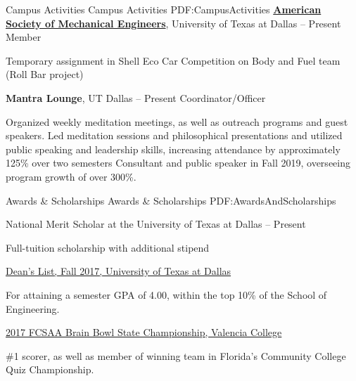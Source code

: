 \documentclass[letterpaper,MMMyyyy,nonstopmode]{simpleresumecv}
\begin{document}
\begin{Body}
\Section
{Campus Activities}
{Campus Activities}
{PDF:CampusActivities}
\Entry
\href{https://www.facebook.com/groups/UTDASME/}
{\textbf{American Society of Mechanical Engineers}},
University of Texas at Dallas
\hfill
{} --
Present
\SmallGap
\BulletItem
Member 
\begin{Detail}
\SubBulletItem
Temporary assignment in Shell Eco Car Competition on Body and Fuel team (Roll Bar project)
\end{Detail}
\Entry
\textbf{Mantra Lounge},
UT Dallas
\hfill
{} --
Present%
\SmallGap
\BulletItem
Coordinator/Officer
\begin{Detail}
\SubBulletItem
Organized weekly meditation meetings, as well as outreach programs and guest speakers.
\SubBulletItem
Led meditation sessions and philosophical presentations and utilized public speaking and leadership skills, increasing attendance by approximately 125\% over two semesters
\SubBulletItem
Consultant and public speaker in Fall 2019, overseeing program growth of over 300\%.
\end{Detail}


\Section
{Awards \&\newline
Scholarships}
{Awards \& Scholarships}
{PDF:AwardsAndScholarships}

\BulletItem
National Merit Scholar at the University of Texas at Dallas
\hfill
{} -- Present
\begin{Detail}
\Item
Full-tuition scholarship with additional stipend %
\end{Detail}

\BulletItem
\href{https://www.utdallas.edu/news/2018/2/8-32826_More-than-1500-Students-Earn-Spots-on-Fall-Deans-L_story-wide.html}
{Dean's List,
Fall 2017,
University of Texas at Dallas}
\hfill
\begin{Detail}
\Item
For attaining a semester GPA of 4.00, within the top 10\% of the School of Engineering.
\end{Detail}

\BulletItem
\href{https://www.naqt.com/stats/tournament/standings.jsp?tournament_id=7594}
{2017 FCSAA Brain Bowl State Championship,
Valencia College}
\hfill
{}
\begin{Detail}
\Item
\#1 scorer, as well as member of winning team in Florida's Community College Quiz Championship.
\end{Detail}


\end{Body}
\end{document}
